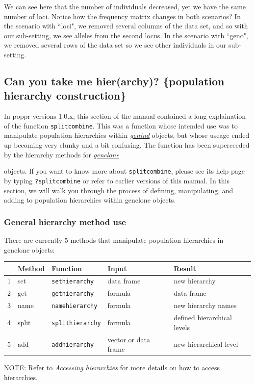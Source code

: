 \documentclass[letterpaper]{article}\usepackage[]{graphicx}\usepackage[]{color}
\newcommand{\tab}{\hspace*{1em}}
\newcommand{\seclink}[2]{
  \textit{\hyperref[#1]{#2}}
}
\begin{document}
We can see here that the number of individuals decreased, yet we have the same number of loci. Notice how the frequency matrix changes in both scenarios? In the scenario with ``loci", we removed several columns of the data set, and so with our sub-setting, we see alleles from the second locus. In the scenario with ``geno", we removed several rows of the data set so we see other individuals in our sub-setting.
\subsection{Can you take me hier(archy)? \{population hierarchy construction\}}\label{data.manip:hier}

\tab\tab In poppr versions 1.0.x, this section of the manual contained a long
explaination of the function \texttt{splitcombine}.
This was a function whose intended use was to manipulate population hierarchies
within \seclink{intro:genind}{genind} objects, but whose useage ended up becoming 
very clunky and a bit confusing. The function has been superceeded by the hierarchy methods for \seclink{intro:genclone}{genclone}
objects. If you want to know more about \texttt{splitcombine}, please see its
help page by typing \texttt{?splitcombine} or refer to earlier versions of this
manual. In this section, we will walk you through the process of defining, 
manipulating, and adding to population hierarchies within genclone objects. 

\subsubsection{General hierarchy method use}\label{data.manip:hier:method}

\tab\tab There are currently 5 methods that manipulate population hierarchies in
genclone objects:

\begin{table}[ht]
\centering
\begin{tabular}{rllll}
  \hline
 & Method & Function & Input & Result\\ 
  \hline
  1 & set & \texttt{sethierarchy} & data frame & new hierarchy\\ 
  2 & get & \texttt{gethierarchy} & formula & data frame\\ 
  3 & name & \texttt{namehierarchy} & formula & new hierarchy names\\ 
  4 & split & \texttt{splithierarchy} & formula & defined hierarchical levels\\ 
  5 & add & \texttt{addhierarchy} & vector or data frame & new hierarchical level\\
   \hline
\end{tabular}
\end{table}
\noindent
NOTE: Refer to \seclink{intro:genclone:access}{Accessing hierarchies} for more
details on how to access hierarchies.\\
\end{document}
